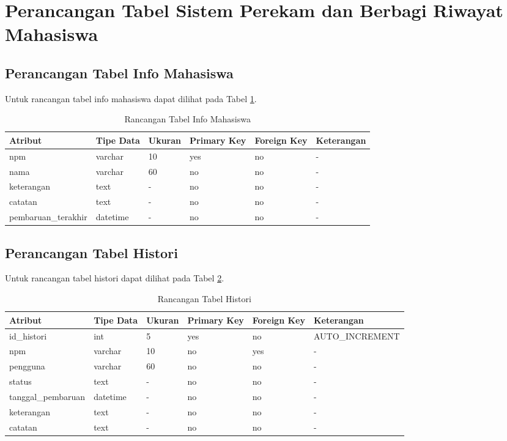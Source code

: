 \section{Perancangan Tabel Sistem Perekam dan Berbagi Riwayat Mahasiswa}
\label{sec:perancangantabel}

\subsection{Perancangan Tabel Info Mahasiswa}
Untuk rancangan tabel info mahasiswa dapat dilihat pada Tabel
\ref{tab:rancangantabelinfomahasiswa}.

\begin{table}[ht]
\caption[Tabel Rancangan Tabel Info Mahasiswa]{Rancangan Tabel Info Mahasiswa}
\label{tab:rancangantabelinfomahasiswa}
\centering
\begin{tabular}{|l|l|p{1.2cm}|p{1.2cm}|p{1.2cm}|l|}
\hline
Atribut & Tipe Data & Ukuran & Primary Key & Foreign Key & Keterangan\\
\hline
npm & varchar & 10 & yes & no & -\\
\hline
nama & varchar & 60 & no & no & -\\
\hline
keterangan & text & - & no & no & -\\
\hline
catatan & text & - & no & no & -\\
\hline
pembaruan\_terakhir & datetime & - & no & no & -\\
\hline
\end{tabular}
\end{table}

\subsection{Perancangan Tabel Histori}
Untuk rancangan tabel histori dapat dilihat pada Tabel
\ref{tab:rancangantabelhistori}.

\begin{table}[ht]
\caption[Tabel Rancangan Tabel Histori]{Rancangan Tabel Histori}
\label{tab:rancangantabelhistori}
\centering
\begin{tabular}{|l|l|p{1.2cm}|p{1.2cm}|p{1.2cm}|l|}
\hline
Atribut & Tipe Data & Ukuran & Primary Key & Foreign Key & Keterangan\\
\hline
id\_histori & int & 5 & yes & no & AUTO\_INCREMENT\\
\hline
npm & varchar & 10 & no & yes & -\\
\hline
pengguna & varchar & 60 & no & no & -\\
\hline
status & text & - & no & no & -\\
\hline
tanggal\_pembaruan & datetime & - & no & no & -\\
\hline
keterangan & text & - & no & no & -\\
\hline
catatan & text & - & no & no & -\\
\hline
\end{tabular}
\end{table}


